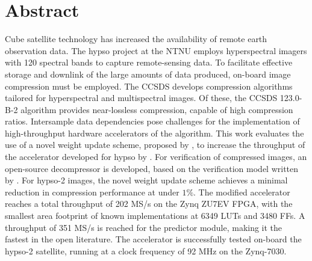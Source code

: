 \chapter*{Abstract}

Cube satellite technology has increased the availability of remote earth observation data. The \acrfull{hypso} project at the \acrfull{NTNU} employs hyperspectral imagers with 120 spectral bands to capture remote-sensing data. To facilitate effective storage and downlink of the large amounts of data produced, on-board image compression must be employed. The \acrfull{CCSDS} develops compression algorithms tailored for hyperspectral and multispectral images. Of these, the CCSDS 123.0-B-2 algorithm provides near-lossless compression, capable of high compression ratios. Intersample data dependencies pose challenges for the implementation of high-throughput hardware accelerators of the algorithm. This work evaluates the use of a novel weight update scheme, proposed by \citeauthor{jiaRemovalFeedbackLoop2025}, to increase the throughput of the accelerator developed for \acrshort{hypso} by \citeauthor{vorhaugHyperspectralImageCompression2024}. For verification of compressed images, an open-source decompressor is developed, based on the verification model written by \citeauthor{vorhaugHyperspectralImageCompression2024}. For \acrshort{hypso}-2 images, the novel weight update scheme achieves a minimal reduction in compression performance at under $1\%$. The modified accelerator reaches a total throughput of 202 MS/s on the Zynq ZU7EV \acrshort{FPGA}, with the smallest area footprint of known implementations at 6349 LUTs and 3480 FFs. A throughput of 351 MS/s is reached for the predictor module, making it the fastest in the open literature. The accelerator is successfully tested on-board the \acrshort{hypso}-2 satellite, running at a clock frequency of 92 MHz on the Zynq-7030.
